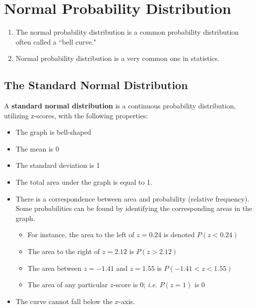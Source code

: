 \documentclass{article}
\begin{document}
\section*{Normal Probability Distribution}

\begin{tcolorbox}[colframe=orange!70!white, coltitle=black, title=\textbf{Summary}]
\begin{enumerate}
    \item The normal probability distribution is a common probability distribution often called a ``bell curve."
    \item Normal probability distribution is a very common one in statistics.
\end{enumerate}
\end{tcolorbox}
\vspace{0.25in}

\subsection*{The Standard Normal Distribution}

A {\color{blue}\textbf{standard normal distribution}} is a continuous probability distribution, utilizing z-scores, with the following properties:
\begin{itemize}
	\item The graph is bell-shaped
	\item The mean is 0
	\item The standard deviation is 1
    \item The total area under the graph is equal to 1.
	\item There is a correspondence between area and probability (relative frequency). Some probabilities can be found by identifying the corresponding areas in the graph.
	\begin{itemize}
	    \item For instance, the area to the left of $z = 0.24$ is denoted $P(z < 0.24)$
	    \item The area to the right of $z = 2.12$ is $P(z > 2.12)$
	    \item The area between $z = -1.41$ and $z = 1.55$ is $P(-1.41 < z < 1.55)$
	    \item The area of any particular $z$-score is 0; \textit{i.e.} $P(z = 1)$ is 0
	\end{itemize}
	\item The curve cannot fall below the $x$-axis.
\end{itemize}
\end{document}
